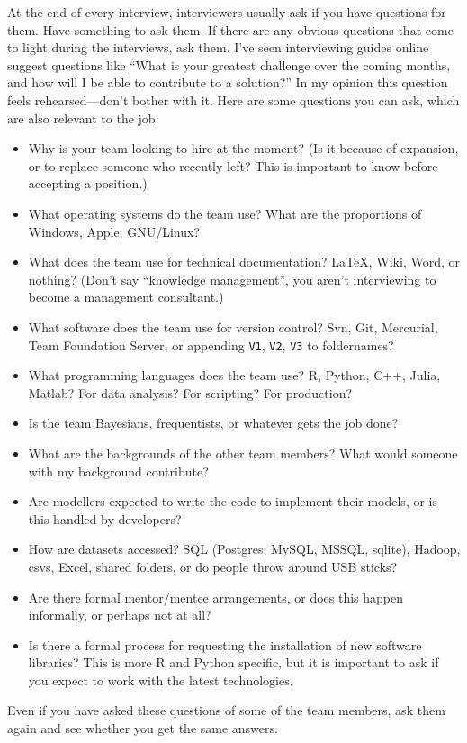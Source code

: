 \documentclass[a4paper]{article}
\begin{document}
At the end of every interview, interviewers usually ask if you have questions for them.
Have something to ask them.
If there are any obvious questions that come to light during the interviews, ask them.
I've seen interviewing guides online suggest questions like
``What is your greatest challenge over the coming months, and how will I be able to contribute to a solution?''
In my opinion this question feels rehearsed---don't bother with it.
Here are some questions you can ask, which are also relevant to the job:
\begin{itemize}
  \item Why is your team looking to hire at the moment? (Is it because of expansion, or to replace someone who recently left? This is important to know before accepting a position.)
  \item What operating systems do the team use?
  What are the proportions of Windows, Apple, GNU/Linux?
  \item  What does the team use for technical documentation? LaTeX, Wiki, Word, or nothing? (Don't say ``knowledge management'', you aren't interviewing to become a management consultant.)
  \item  What software does the team use for version control? Svn, Git, Mercurial, Team Foundation Server, or appending
  \verb+V1+,
  \verb+V2+,
  \verb+V3+
  to foldernames?
  \item  What programming languages does the team use? R, Python, C++, Julia, Matlab?
  For data analysis? For scripting? For production?
  \item  Is the team Bayesians, frequentists, or whatever gets the job done?
  \item  What are the backgrounds of the other team members? What would someone with my background contribute?
  \item  Are modellers expected to write the code to implement their models, or is this handled by developers?
  \item  How are datasets accessed? SQL (Postgres, MySQL, MSSQL, sqlite), Hadoop, csvs, Excel, shared folders, or do people throw around USB sticks?
  \item  Are there formal mentor/mentee arrangements, or does this happen informally, or perhaps not at all?
  \item  Is there a formal process for requesting the installation of new software libraries?
  This is more R and Python specific, but it is important to ask if you expect to work with the latest technologies.
\end{itemize}
Even if you have asked these questions of some of the team members, ask them again and see whether you get the same answers.
\end{document}
